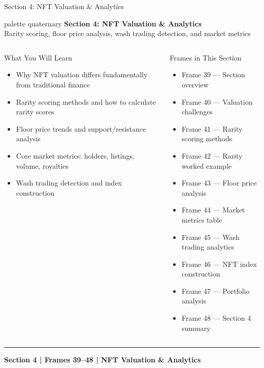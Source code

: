 \documentclass[8pt,aspectratio=169]{beamer}
\newcommand{\bottomnote}[1]{\vfill\vspace{-2mm}\textcolor{mllavender2}{\rule{\textwidth}{0.4pt}}\vspace{1mm}\footnotesize\textbf{#1}}
\begin{document}
\begin{frame}{Section 4: NFT Valuation \& Analytics}
\begin{beamercolorbox}[sep=12pt,center,rounded=true,shadow=true]{palette quaternary}
  {\Large\bfseries Section 4: NFT Valuation \& Analytics}\\[4pt]
  {\normalsize Rarity scoring, floor price analysis, wash trading detection, and market metrics}
\end{beamercolorbox}

\vspace{4mm}
\begin{columns}[T]
\begin{block}{What You Will Learn}
\begin{itemize}\setlength{\itemsep}{2pt}
  \item Why NFT valuation differs fundamentally from traditional finance
  \item Rarity scoring methods and how to calculate rarity scores
  \item Floor price trends and support/resistance analysis
  \item Core market metrics: holders, listings, volume, royalties
  \item Wash trading detection and index construction
\end{itemize}
\end{block}
\begin{block}{Frames in This Section}
\begin{itemize}\setlength{\itemsep}{1pt}
  \item Frame 39 --- Section overview
  \item Frame 40 --- Valuation challenges
  \item Frame 41 --- Rarity scoring methods
  \item Frame 42 --- Rarity worked example
  \item Frame 43 --- Floor price analysis
  \item Frame 44 --- Market metrics table
  \item Frame 45 --- Wash trading analytics
  \item Frame 46 --- NFT index construction
  \item Frame 47 --- Portfolio analysis
  \item Frame 48 --- Section 4 summary
\end{itemize}
\end{block}
\end{columns}
\bottomnote{Section 4 | Frames 39--48 | NFT Valuation \& Analytics}
\end{frame}
\end{document}
